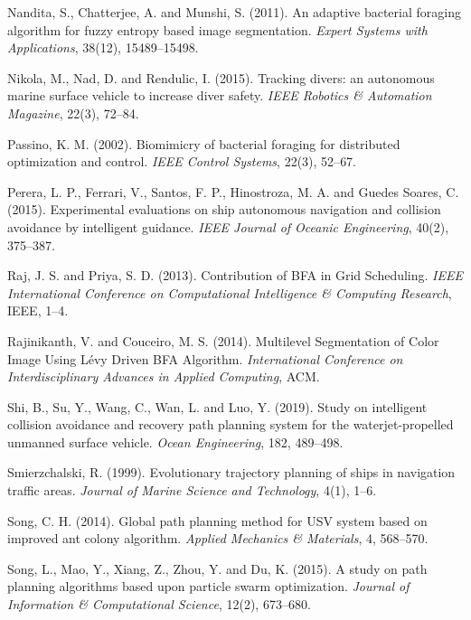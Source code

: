\documentclass{PDS}%
\theoremstyle{definition}
\begin{document}
\begin{Backmatter}
\begin{thebibliography}{}
{Nandita, S., Chatterjee, A. and Munshi, S.} ({2011}). An adaptive bacterial foraging algorithm for fuzzy entropy based image segmentation.
\textit{Expert Systems with Applications}, {38}(12), 15489--15498.

{Nikola, M., Nad, D. and Rendulic, I.} ({2015}). Tracking divers: an autonomous marine surface vehicle to increase diver safety.
\textit{IEEE Robotics \& Automation Magazine}, {22}(3), 72--84.

{Passino, K. M.} (2002). Biomimicry of bacterial foraging for distributed optimization and control.
\textit{IEEE Control Systems}, {22}(3), 52--{67.}

{Perera, L. P., Ferrari, V., Santos, F. P., Hinostroza, M. A. and Guedes Soares, C.} ({2015}).
Experimental evaluations on ship autonomous navigation and collision avoidance by intelligent guidance.
\textit{IEEE Journal of Oceanic Engineering}, {40}(2), 375--387.

{Raj, J. S. and Priya, S. D.} ({2013}).
Contribution of BFA in Grid Scheduling. \textit{IEEE International Conference on Computational Intelligence \& Computing Research}, IEEE, 1--4.

{Rajinikanth, V. and Couceiro, M. S.} ({2014}).
Multilevel Segmentation of Color Image Using L\'evy Driven BFA Algorithm.
\textit{International Conference on Interdisciplinary Advances in Applied Computing}, ACM.

{Shi, B., Su, Y., Wang, C., Wan, L. and Luo, Y.} ({2019}).
Study on intelligent collision avoidance and recovery path planning system for the waterjet-propelled unmanned surface vehicle.
\textit{Ocean Engineering},
{182}, 489--498.

{Smierzchalski, R.} ({1999}). Evolutionary trajectory planning of ships in navigation traffic areas.
\textit{Journal of Marine Science and Technology},
{4}(1), 1--{6.}

{Song, C. H.} ({2014}). Global path planning method for USV system based on improved ant colony algorithm.
\textit{Applied Mechanics \& Materials}, {4}, 568--570.

{Song, L., Mao, Y.,  Xiang, Z., Zhou, Y.  and Du, K. } ({2015}).
A study on path planning algorithms based upon particle swarm optimization.
\textit{Journal of Information \& Computational Science}, {12}(2), 673--680.


\end{thebibliography}
\end{Backmatter}
\end{document}

